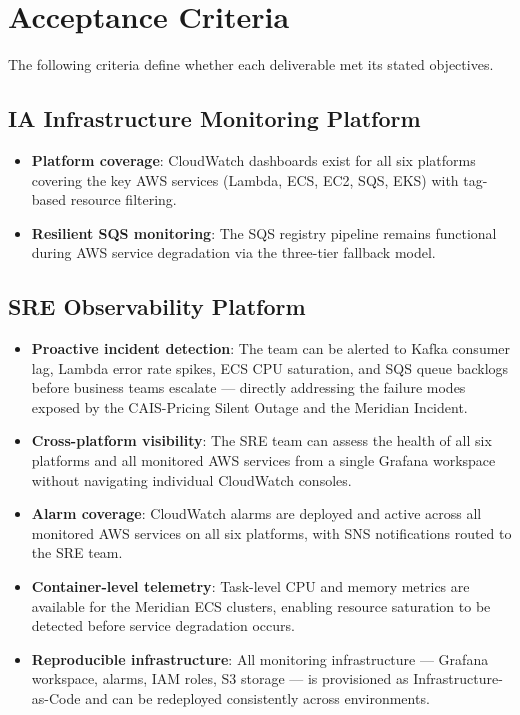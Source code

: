 \FloatBarrier

\section{Acceptance Criteria}
\label{sec:acceptance_criteria}


The following criteria define whether each deliverable met its stated
objectives.

\subsection{IA Infrastructure Monitoring Platform}

\begin{itemize}
    \item \textbf{Platform coverage}: CloudWatch dashboards exist for
          all six platforms covering the key AWS services (Lambda, ECS,
          EC2, SQS, EKS) with tag-based resource filtering.

    \item \textbf{Resilient SQS monitoring}: The SQS registry pipeline
          remains functional during AWS service degradation via the
          three-tier fallback model.
\end{itemize}


\subsection{SRE Observability Platform}

\begin{itemize}
    \item \textbf{Proactive incident detection}: The team can be alerted
          to Kafka consumer lag, Lambda error rate spikes, ECS CPU
          saturation, and SQS queue backlogs before business teams
          escalate --- directly addressing the failure modes exposed by
          the CAIS-Pricing Silent Outage and the Meridian Incident.

    \item \textbf{Cross-platform visibility}: The SRE team can assess
          the health of all six platforms and all monitored AWS services
          from a single Grafana workspace without navigating individual
          CloudWatch consoles.

    \item \textbf{Alarm coverage}: CloudWatch alarms are deployed and
          active across all monitored AWS services on all six platforms,
          with SNS notifications routed to the SRE team.

    \item \textbf{Container-level telemetry}: Task-level CPU and memory
          metrics are available for the Meridian ECS clusters, enabling
          resource saturation to be detected before service degradation
          occurs.

    \item \textbf{Reproducible infrastructure}: All monitoring
          infrastructure --- Grafana workspace, alarms, IAM roles, S3
          storage --- is provisioned as Infrastructure-as-Code and
          can be redeployed consistently across environments.
\end{itemize}


